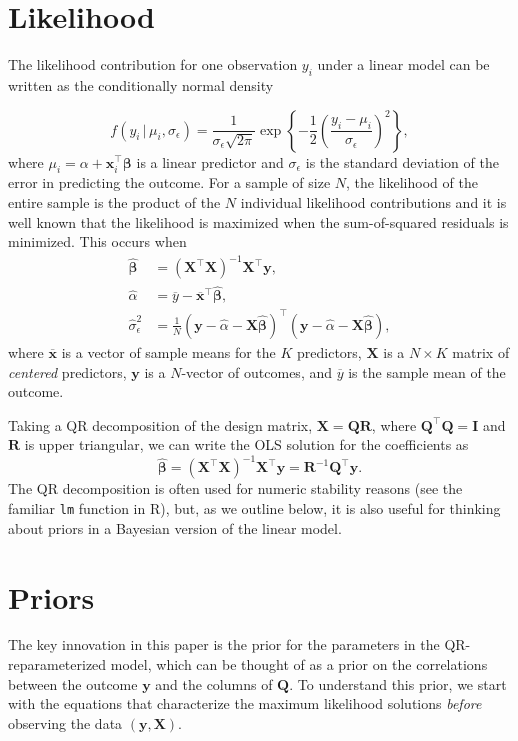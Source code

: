 \documentclass[11pt]{article}
\newcommand{\boldbeta}{\boldsymbol{\beta}}
\newcommand{\hatbeta}{\widehat{\boldbeta}}
\newcommand{\hatalpha}{\widehat{\alpha}}
\newcommand{\sigmaEps}{\sigma_{\epsilon}}
\newcommand{\X}{\mathbf{X}}
\newcommand{\y}{\mathbf{y}}
\newcommand{\Q}{\mathbf{Q}}
\newcommand{\R}{\mathbf{R}}
\begin{document}
\section{Likelihood}

The likelihood contribution for one observation $y_i$ under a linear model
can be written as the conditionally normal density

$$
f \left(y_i \,|\, \mu_i, \sigmaEps \right) = \frac{1}{\sigmaEps \sqrt{2 \pi}}
\exp{\left\{-\frac{1}{2} \left(\frac{y_i - \mu_i}{\sigmaEps}\right)^2\right\}},
$$
%
where $\mu_i = \alpha + \mathbf{x}_i^\top \boldbeta$ is a linear
predictor and $\sigmaEps$ is the standard deviation of the error in predicting
the outcome. For a sample of size $N$, the likelihood of the entire sample is
the product of the $N$ individual likelihood contributions and it is well known
that the likelihood is maximized when the sum-of-squared residuals is minimized.
This occurs when
%
\begin{align*}
\hatbeta &= \left(\X^\top \X \right)^{-1} \X^\top \y,\\
\hatalpha &= \overline{y} - \overline{\mathbf{x}}^\top \hatbeta,\\
\widehat{\sigma}_{\epsilon}^2 &=
  \frac{1}{N}
  \left(\y - \hatalpha - \X \hatbeta \right)^\top
  \left(\y - \hatalpha - \X \hatbeta \right),
\end{align*}
%
where $\overline{\mathbf{x}}$ is a vector of sample means for the
$K$ predictors, $\X$ is a $N \times K$ matrix of \emph{centered} predictors,
$\y$ is a $N$-vector of outcomes, and $\overline{y}$ is the sample mean of the
outcome.

Taking a QR decomposition of the design matrix, $\X = \Q\R$, where
$\Q^\top \Q = \mathbf{I}$ and $\R$ is upper triangular, we can write the OLS
solution for the coefficients as
$$\hatbeta = \left(\X^\top \X \right)^{-1} \X^\top \y = \R^{-1} \Q^\top \y.$$
%
The QR decomposition is often used for numeric stability reasons (see the
familiar {\tt lm} function in R), but, as we outline below, it is also useful
for thinking about priors in a Bayesian version of the linear model.


\section{Priors}

The key innovation in this paper is the prior for the parameters in the
QR-reparameterized model, which can be thought of as a prior on the correlations
between the outcome $\y$ and the columns of $\Q$. To understand this prior, we
start with the equations that characterize the maximum likelihood solutions
\emph{before} observing the data $\left(\y, \X\right)$.
\end{document}
